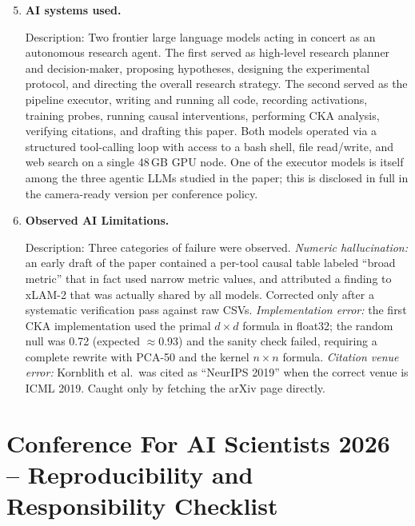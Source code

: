 \documentclass{article}
\begin{document}
\begin{enumerate}
\setcounter{enumi}{4}

\item \textbf{AI systems used.}

Description: Two frontier large language models acting in concert
as an autonomous research agent.
The first served as high-level research planner and decision-maker,
proposing hypotheses, designing the experimental protocol, and
directing the overall research strategy.
The second served as the pipeline executor, writing and running all
code, recording activations, training probes, running causal
interventions, performing CKA analysis, verifying citations, and
drafting this paper.
Both models operated via a structured tool-calling loop with access
to a bash shell, file read/write, and web search on a single 48\,GB
GPU node.
One of the executor models is itself among the three agentic LLMs
studied in the paper; this is disclosed in full in the camera-ready
version per conference policy.

\item \textbf{Observed AI Limitations.}

Description: Three categories of failure were observed.
\emph{Numeric hallucination:} an early draft of the paper contained a
per-tool causal table labeled ``broad metric'' that in fact used narrow
metric values, and attributed a finding to xLAM-2 that was actually
shared by all models.  Corrected only after a systematic verification
pass against raw CSVs.
\emph{Implementation error:} the first CKA implementation used the
primal $d{\times}d$ formula in float32; the random null was 0.72
(expected $\approx$0.93) and the sanity check failed, requiring a
complete rewrite with PCA-50 and the kernel $n{\times}n$ formula.
\emph{Citation venue error:} Kornblith et al.\ was cited as
``NeurIPS 2019'' when the correct venue is ICML 2019.  Caught only
by fetching the arXiv page directly.

\end{enumerate}

\newpage
\section*{Conference For AI Scientists 2026 -- Reproducibility and Responsibility Checklist}
\label{checklist_reproducibility}
\end{document}
